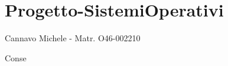 \section*{Progetto-\/\+Sistemi\+Operativi }

Cannavo\textquotesingle{} Michele -\/ Matr. O46-\/002210

Conse 